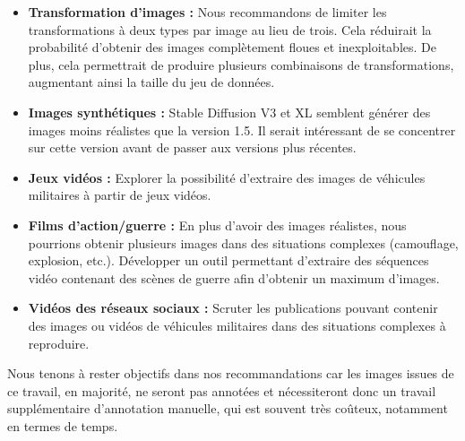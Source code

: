 \begin{itemize}
    \item \textbf{Transformation d'images :} Nous recommandons de limiter les transformations à deux types par image au lieu de trois. Cela réduirait la probabilité d'obtenir des images complètement floues et inexploitables. De plus, cela permettrait de produire plusieurs combinaisons de transformations, augmentant ainsi la taille du jeu de données.
    \item \textbf{Images synthétiques :} Stable Diffusion V3 et XL semblent générer des images moins réalistes que la version 1.5. Il serait intéressant de se concentrer sur cette version avant de passer aux versions plus récentes.
    \item \textbf{Jeux vidéos :} Explorer la possibilité d'extraire des images de véhicules militaires à partir de jeux vidéos.
    \item \textbf{Films d'action/guerre :} En plus d'avoir des images réalistes, nous pourrions obtenir plusieurs images dans des situations complexes (camouflage, explosion, etc.). Développer un outil permettant d'extraire des séquences vidéo contenant des scènes de guerre afin d'obtenir un maximum d'images.
    \item \textbf{Vidéos des réseaux sociaux :} Scruter les publications pouvant contenir des images ou vidéos de véhicules militaires dans des situations complexes à reproduire.
\end{itemize}

Nous tenons à rester objectifs dans nos recommandations car les images issues de ce travail, en majorité, ne seront pas annotées et nécessiteront donc un travail supplémentaire d’annotation manuelle, qui est souvent très coûteux, notamment en termes de temps.
